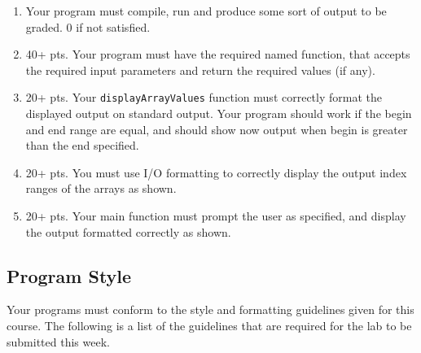 \documentclass[11pt]{article}
\begin{document}
\begin{enumerate}
\item Your program must compile, run and produce some sort of output to be
graded. 0 if not satisfied.
\item 40+ pts.  Your program must have the required named function,
that accepts the required input parameters and return the required
values (if any).
\item 20+ pts. Your \verb~displayArrayValues~ function must correctly format
the displayed output on standard output.  Your program should work
if the begin and end range are equal, and should show now output
when begin is greater than the end specified.
\item 20+ pts.  You must use I/O formatting to correctly display the
output index ranges of the arrays as shown.
\item 20+ pts. Your main function must prompt the user as specified, and
display the output formatted correctly as shown.
\end{enumerate}

\subsection*{Program Style}
\label{sec-4-2}

Your programs must conform to the style and formatting guidelines given for this course.
The following is a list of the guidelines that are required for the lab to be submitted
this week.
\end{document}
